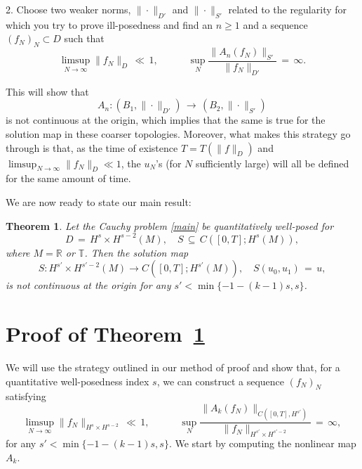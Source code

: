 \documentclass{amsart}
\newtheorem{theorem}{Theorem}[section]
\begin{document}
2. Choose two weaker norms, $\| \cdot\|_{D'}$ and $\| \cdot\|_{S'}$ related to the regularity for which you try to prove ill-posedness and find an $n\geq 1$ and a sequence $(f_N)_N\subset D$ such that
\begin{equation}
\limsup_{N\to \infty} \|f_N\|_D\,\ll\,1, \qquad \quad \sup_N \frac{\|A_n(f_N)\|_{S'}}{\|f_N\|_{D'}}\,=\,\infty.
\label{ip}
\end{equation}

This will show that 
\begin{equation}
A_n: (B_1,\|\cdot \|_{D'})\,\longrightarrow\,(B_2,\| \cdot\|_{S'})
\end{equation} 
is not continuous at the origin, which implies that the same is true for the solution map in these coarser  topologies. Moreover, what makes this strategy go through is that, as the time of existence $T=T(\|f\|_D)$ and $\limsup_{N\to \infty} \|f_N\|_D \ll 1$, the $u_N$'s (for $N$ sufficiently large) will all be defined for the same amount of time.


We are now ready to state our main result:

\begin{theorem}
Let the Cauchy problem \eqref{main} be quantitatively well-posed for
\[
D\,=\,H^s \times H^{s-2}(M), \quad S\,\subseteq \,C([0,T]; H^s(M)), \]
where  $M=\mathbb{R}$ or $\mathbb{T}$. Then the solution map
\begin{equation}
S: H^{s'} \times H^{s'-2}(M) \to C([0,T]; H^{s'}(M)), \quad
S(u_0,u_1)\,=\,u,
\label{solmap}
\end{equation}
is not continuous at the origin for any $s'< \min\{-1-(k-1)s, s\}$.
\label{mainth}
\end{theorem}

\section{Proof of Theorem~\ref{mainth}}
We will use the strategy outlined in our method of proof and show that, for a quantitative well-posedness  index $s$, we can construct a sequence $(f_N)_N$ satisfying
\[
\limsup_{N\to \infty} \|f_N\|_{H^s \times H^{s-2}}\,\ll\,1, \qquad \quad \sup_N \frac{\|A_{k}(f_N)\|_{C([0,T],H^{s'})}}{\|f_N\|_{H^{s'} \times H^{s'-2}}}\,=\,\infty,\]
for any $s'< \min\{-1-(k-1)s, s\}$. We start by computing the nonlinear map $A_{k}$.
\end{document}
